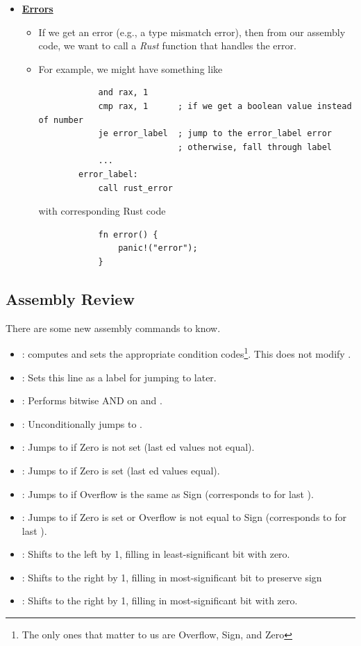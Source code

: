 \begin{itemize}
    \item \underline{\textbf{Errors}}
    \begin{itemize}
        \item If we get an error (e.g., a type mismatch error), then from our assembly code, we want to call a \emph{Rust} function that handles the error. 
        \item For example, we might have something like 
        \begin{verbatim}
            and rax, 1 
            cmp rax, 1      ; if we get a boolean value instead of number
            je error_label  ; jump to the error_label error 
                            ; otherwise, fall through label
            ...
        error_label: 
            call rust_error\end{verbatim}
        with corresponding Rust code 
        \begin{verbatim}
            fn error() {
                panic!("error");
            }\end{verbatim}
    \end{itemize}
\end{itemize}


\subsection{Assembly Review}
There are some new assembly commands to know.
\begin{itemize}
    \item {}: computes  and sets the appropriate condition codes\footnote{The only ones that matter to us are Overflow, Sign, and Zero}. This does not modify .
    \item {}: Sets this line as a label for jumping to later. 
    \item {}: Performs bitwise AND on  and . 
    \item {}: Unconditionally jumps to .
    \item {}: Jumps to  if Zero is not set (last ed values not equal).
    \item {}: Jumps to  if Zero is set (last ed values equal).
    \item {}: Jumps to  if Overflow is the same as Sign (corresponds to \code{>=} for last ).
    \item {}: Jumps to  if Zero is set or Overflow is not equal to Sign (corresponds to \code{<=} for last ).
    \item {}: Shifts  to the left by 1, filling in least-significant bit with zero.
    \item {}: Shifts  to the right by 1, filling in most-significant bit to preserve sign
    \item {}: Shifts  to the right by 1, filling in most-significant bit with zero.
\end{itemize}

